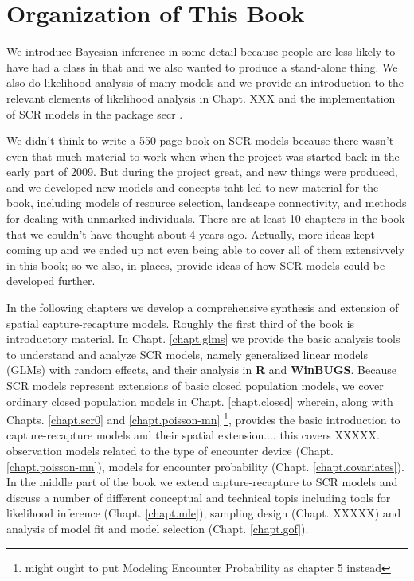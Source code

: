 \section*{Organization of This Book}


We introduce Bayesian inference in some
detail because people are less likely to have had a class in that and
we also wanted to produce a stand-alone thing.   We also do
likelihood analysis of many models and we provide an introduction to
the relevant elements of likelihood analysis in Chapt. XXX and the
implementation of SCR models in the package secr \citep{efford_etal:2009euring}.

We didn't
think to write a 550 page book on SCR models because there wasn't even
that much material to work when when the project was started back in
the early part of 2009. But during the project great, and new things were
produced, and we developed new models and concepts taht led to new
material for the book, including models of resource selection,
landscape connectivity, and methods for dealing with unmarked
individuals. There are at least 10 chapters in the book that we
couldn't have thought about 4 years ago. Actually, more ideas kept coming up and we ended up not even being able to cover all of them extensivvely in this book; so we also, in places, provide ideas of how SCR models could be developed further. 

In the following chapters we develop a comprehensive synthesis and
extension of spatial capture-recapture models.  Roughly the first
third of the book is introductory material. In
Chapt. \ref{chapt.glms} we provide the basic analysis tools to
understand and analyze SCR models, namely generalized linear models
(GLMs) with random effects, and their analysis in {\bf R} and {\bf
  WinBUGS}.  Because SCR models represent extensions of basic closed
population models, we cover ordinary closed population models in
Chapt. \ref{chapt.closed} wherein, along with Chapts. \ref{chapt.scr0}
and \ref{chapt.poisson-mn} \footnote{might ought to put Modeling
  Encounter Probability as chapter 5 instead}, provides the basic
introduction to capture-recapture models and their spatial
extension.... this covers XXXXX.  observation models related to the
type of encounter device (Chapt. \ref{chapt.poisson-mn}), models for
encounter probability (Chapt. \ref{chapt.covariates}). In the middle
part of the book we extend capture-recapture to SCR models and discuss
a number of different conceptual and technical topis including tools
for likelihood inference (Chapt. \ref{chapt.mle}), sampling design
(Chapt. XXXXX) and analysis of model fit and model selection
(Chapt. \ref{chapt.gof}).


